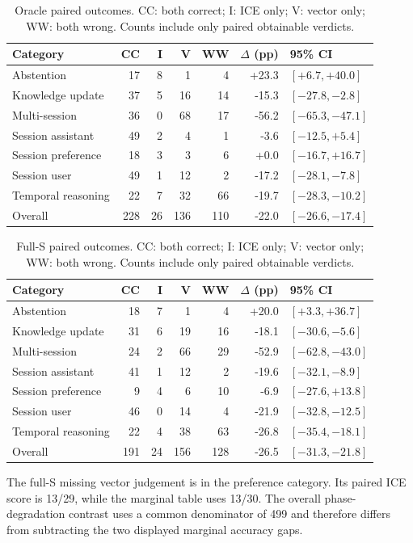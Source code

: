 \documentclass[11pt,a4paper]{article}
\begin{document}
\begin{table}[htbp]
\centering\small
\caption{Oracle paired outcomes. CC: both correct; I: ICE only; V: vector only; WW: both wrong. Counts include only paired obtainable verdicts.}
\label{tab:paired-oracle}
\begin{tabular}{@{}lrrrrrl@{}}\toprule
Category & CC & I & V & WW & $\Delta$ (pp) & 95\% CI\\\midrule
Abstention & 17 & 8 & 1 & 4 & +23.3 & $[+6.7,+40.0]$\\
Knowledge update & 37 & 5 & 16 & 14 & -15.3 & $[-27.8,-2.8]$\\
Multi-session & 36 & 0 & 68 & 17 & -56.2 & $[-65.3,-47.1]$\\
Session assistant & 49 & 2 & 4 & 1 & -3.6 & $[-12.5,+5.4]$\\
Session preference & 18 & 3 & 3 & 6 & +0.0 & $[-16.7,+16.7]$\\
Session user & 49 & 1 & 12 & 2 & -17.2 & $[-28.1,-7.8]$\\
Temporal reasoning & 22 & 7 & 32 & 66 & -19.7 & $[-28.3,-10.2]$\\
Overall & 228 & 26 & 136 & 110 & -22.0 & $[-26.6,-17.4]$\\
\bottomrule\end{tabular}
\end{table}

\begin{table}[htbp]
\centering\small
\caption{Full-S paired outcomes. CC: both correct; I: ICE only; V: vector only; WW: both wrong. Counts include only paired obtainable verdicts.}
\label{tab:paired-full}
\begin{tabular}{@{}lrrrrrl@{}}\toprule
Category & CC & I & V & WW & $\Delta$ (pp) & 95\% CI\\\midrule
Abstention & 18 & 7 & 1 & 4 & +20.0 & $[+3.3,+36.7]$\\
Knowledge update & 31 & 6 & 19 & 16 & -18.1 & $[-30.6,-5.6]$\\
Multi-session & 24 & 2 & 66 & 29 & -52.9 & $[-62.8,-43.0]$\\
Session assistant & 41 & 1 & 12 & 2 & -19.6 & $[-32.1,-8.9]$\\
Session preference & 9 & 4 & 6 & 10 & -6.9 & $[-27.6,+13.8]$\\
Session user & 46 & 0 & 14 & 4 & -21.9 & $[-32.8,-12.5]$\\
Temporal reasoning & 22 & 4 & 38 & 63 & -26.8 & $[-35.4,-18.1]$\\
Overall & 191 & 24 & 156 & 128 & -26.5 & $[-31.3,-21.8]$\\
\bottomrule\end{tabular}
\end{table}
The full-S missing vector judgement is in the preference category. Its paired ICE score is 13/29, while the marginal table uses 13/30. The overall phase-degradation contrast uses a common denominator of 499 and therefore differs from subtracting the two displayed marginal accuracy gaps.
\end{document}
